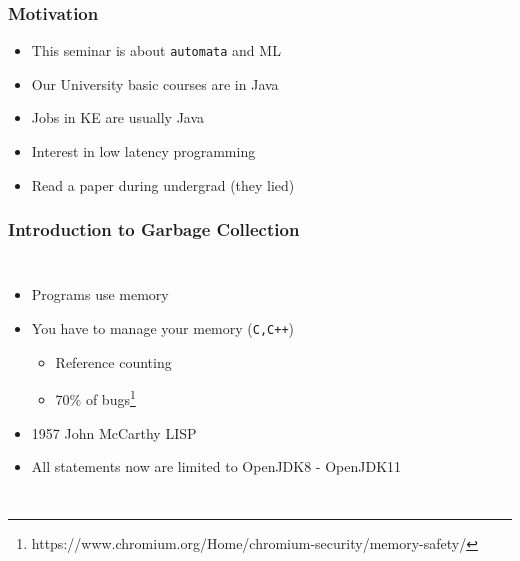 \documentclass{beamer}
\begin{document}
\begin{frame}
    \frametitle{Motivation}
    \begin{itemize}
        \item This seminar is about \texttt{automata} and ML 
        \item Our University basic courses are in Java 
        \item Jobs in KE are usually Java
        \item Interest in low latency programming
        \item Read a paper during undergrad (they lied)
    \end{itemize}
\end{frame}
\begin{frame}

    \frametitle{Introduction to Garbage Collection}
    \begin{columns}
        \begin{itemize}
            \item Programs use memory
            \item You have to manage your memory (\texttt{C,C++})
            \begin{itemize}
                \item Reference counting 
                \item 70\% of bugs\footnote{https://www.chromium.org/Home/chromium-security/memory-safety/}
            \end{itemize}
            \item 1957 John McCarthy LISP
            \item All statements now are limited to OpenJDK8 - OpenJDK11
          \end{itemize}
        

\end{columns}
\end{frame}
\end{document}
